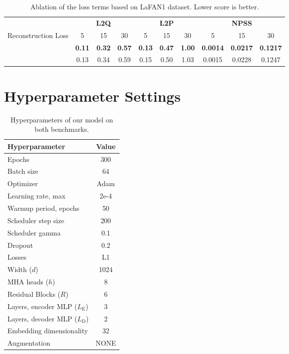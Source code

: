 \documentclass[letterpaper]{article} \usepackage[]{aaai23}  \usepackage{times}  \usepackage{helvet}  \usepackage{courier}  \usepackage[hyphens]{url}  \usepackage{graphicx} \urlstyle{rm} \def\UrlFont{\rm}  \usepackage{natbib}  \usepackage{caption} \frenchspacing  \setlength{\pdfpagewidth}{8.5in} \setlength{\pdfpageheight}{11in}
\newcommand{\ballot}{\ding{55}}
\renewcommand{\checkmark}{\ding{51}}
\begin{document}
\begin{table*}[!ht]
\centering
\caption{Ablation of the loss terms based on LaFAN1 dataset. Lower score is better.}
\centering
\begin{tabular}{cccccccccc}
\multicolumn{1}{c}{} &\multicolumn{3}{c}{\textbf{L2Q}} &\multicolumn{3}{c}{\textbf{L2P}} &\multicolumn{3}{c}{\textbf{NPSS}} \\
\cmidrule(lr){2-4}\cmidrule(lr){5-7}\cmidrule(lr){8-10}
Reconstruction Loss & 5 & 15 & 30 & 5 & 15 & 30 & 5 & 15 & 30\\
\cmidrule(lr){1-10}
\checkmark & \bf{0.11}	& \bf{0.32} &	\bf{0.57} &	\bf{0.13} &	\bf{0.47} &	\bf{1.00} &	\bf{0.0014} &	\bf{0.0217} &	\bf{0.1217} \\
\ballot & 0.13 & 0.34 & 0.59 & 0.15 & 0.50 & 1.03 & 0.0015 & 0.0228 & 0.1247 \\
\cmidrule(lr){1-10}
\end{tabular}
\label{tab:ablation_loss_terms}
\end{table*}


\section{Hyperparameter Settings} \label{app:hyperparameter_settings}

\begin{table}[!ht]
    \centering
    \begin{tabular}{lc}
        \toprule
        Hyperparameter & Value  \\ 
        \midrule
        Epochs	& 300	\\ 
        Batch size & 64	\\
        Optimizer & Adam \\
        Learning rate, max & 2e-4  \\
        Warmup period, epochs & 50 \\
        Scheduler step size & 200 \\
        Scheduler gamma & 0.1 \\
        Dropout & 0.2 \\
        Losses & L1 \\
        Width ($d$) & 1024 \\
        MHA heads ($h$) & 8 \\
        Residual Blocks ($R$) & 6 \\
        Layers, encoder MLP ($L_{\textrm{E}}$) & 3 \\
        Layers, decoder MLP ($L_{\textrm{D}}$) & 2 \\
        Embedding dimensionality & 32 \\
        Augmentation & NONE \\
        \bottomrule
    \end{tabular}
    \vspace{1em}
    \caption{Hyperparameters of our model on both benchmarks.}
    \label{table:hyperparameter_settings}
\end{table}
\end{document}
